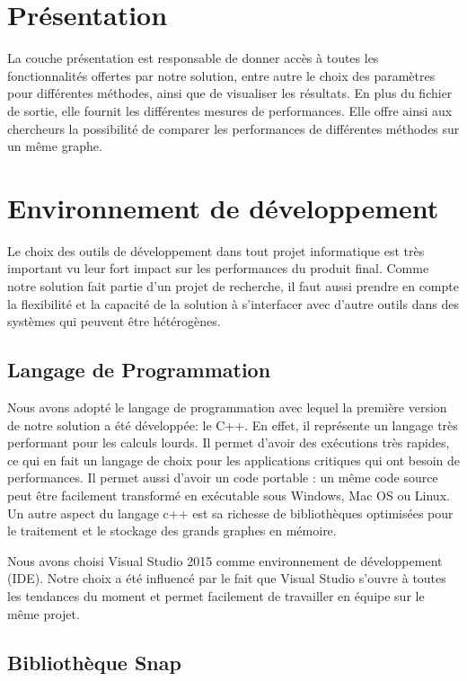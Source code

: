 	
	\section{Présentation}
	
	La couche présentation est responsable de donner accès à toutes les fonctionnalités offertes par notre solution, entre autre le choix des paramètres pour différentes méthodes, ainsi que de visualiser les résultats. En plus du fichier de sortie, elle fournit les différentes mesures de performances. Elle offre ainsi aux chercheurs la possibilité de comparer les performances de différentes méthodes sur un même graphe. 
	
	\section{Environnement de développement}
		
		Le choix des outils de développement dans tout projet informatique est très important vu leur fort impact sur les performances du produit final. Comme notre solution fait partie d'un projet de recherche, il faut aussi prendre en compte la flexibilité et la capacité de la solution à s'interfacer avec d'autre outils dans des systèmes qui peuvent être hétérogènes. 
		
		\subsection{Langage de Programmation}
		Nous avons adopté le langage de programmation avec lequel la    première version de notre solution a été développée: le C++. En effet, il représente un langage très performant pour les calculs lourds. Il permet d'avoir des exécutions très rapides, ce qui en fait un langage de choix pour les applications critiques qui ont besoin de performances. Il permet aussi d'avoir un code portable : un même code source peut être facilement transformé en exécutable sous Windows, Mac OS ou Linux. Un autre aspect du langage c++ est sa richesse de bibliothèques optimisées pour le traitement et le stockage des grands graphes en mémoire. 
		
		Nous avons choisi Visual Studio 2015 comme environnement de développement (IDE). Notre choix a été influencé par le fait que Visual Studio s'ouvre à toutes les tendances du moment et permet facilement de travailler en équipe sur le même projet.
		
		\subsection{Bibliothèque Snap}
		\label{snaplib}
			
